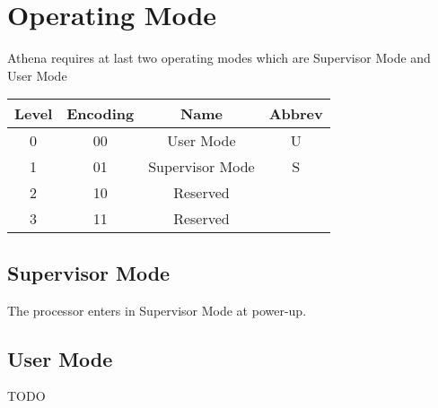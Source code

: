 \section{Operating Mode}

Athena requires at last two operating modes which are Supervisor Mode and User Mode

\begin{tabular}{ | c | c | c | c | }
    \hline
    Level & Encoding & Name & Abbrev \\ \hline
    0 & 00 & User Mode & U \\
    1 & 01 & Supervisor Mode & S \\
    2 & 10 & Reserved & \\
    3 & 11 & Reserved & \\
    \hline
\end{tabular}

\subsection{Supervisor Mode}

The processor enters in Supervisor Mode at power-up.

\subsection{User Mode}

TODO
